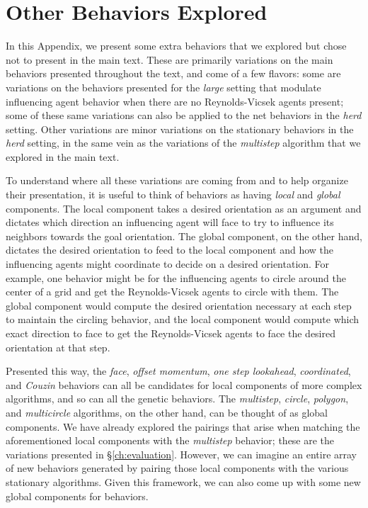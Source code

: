 \chapter{Other Behaviors Explored}
\label{AppendixA}

In this Appendix, we present some extra behaviors that we explored but chose
not to present in the main text.
These are primarily variations on the main behaviors presented throughout the
text, and come of a few flavors: some are variations on the behaviors presented
for the \textit{large} setting that modulate influencing agent behavior when
there are no Reynolds-Vicsek agents present; some of these same variations can
also be applied to the net behaviors in the \textit{herd} setting.
Other variations are minor variations on the stationary behaviors in the
\textit{herd} setting, in the same vein as the variations of the
\textit{multistep} algorithm that we explored in the main text.

To understand where all these variations are coming from and to help organize
their presentation, it is useful to think of behaviors as having \textit{local}
and \textit{global} components.
The local component takes a desired orientation as an argument and dictates
which direction an influencing agent will face to try to influence its
neighbors towards the goal orientation.
The global component, on the other hand, dictates the desired orientation to
feed to the local component and how the influencing agents might coordinate to
decide on a desired orientation.
For example, one behavior might be for the influencing agents to circle around
the center of a grid and get the Reynolds-Vicsek agents to circle with them.
The global component would compute the desired orientation necessary at each
step to maintain the circling behavior, and the local component would compute
which exact direction to face to get the Reynolds-Vicsek agents to face the
desired orientation at that step.

Presented this way, the \textit{face}, \textit{offset momentum}, \textit{one
step lookahead}, \textit{coordinated}, and \textit{Couzin} behaviors can all
be candidates for local components of more complex algorithms, and so can all
the genetic behaviors.
The \textit{multistep}, \textit{circle}, \textit{polygon}, and
\textit{multicircle} algorithms, on the other hand, can be thought of as global
components.
We have already explored the pairings that arise when matching the
aforementioned local components with the \textit{multistep} behavior; these are
the variations presented in \S\ref{ch:evaluation}.
However, we can imagine an entire array of new behaviors generated by pairing
those local components with the various stationary algorithms.
Given this framework, we can also come up with some new global components for
behaviors.

